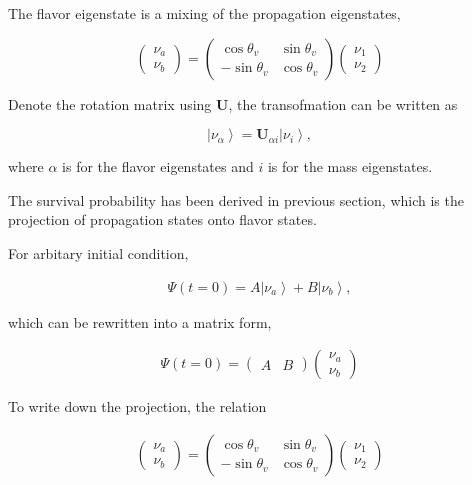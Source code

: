 \documentclass{tufte-handout}
\newcommand{\ket}[1]{\left| #1\right\rangle}
\begin{document}
The flavor eigenstate is a mixing of the propagation eigenstates,

\begin{equation}
\begin{pmatrix}
\nu_a \\ \nu_b \end{pmatrix} = 
\begin{pmatrix} \cos\theta_v & \sin\theta_v \\ -\sin\theta_v  & \cos\theta_v
\end{pmatrix} \begin{pmatrix}  \nu_1 \\ \nu_2
\end{pmatrix}
\end{equation}


Denote the rotation matrix using $\mathbf U$, the transofmation can be written as

\begin{equation}
\ket{\nu_{\alpha}} = \mathbf U_{\alpha i} \ket{\nu_i},
\end{equation}

where $\alpha$ is for the flavor eigenstates and $i$ is for the mass eigenstates.

The survival probability has been derived in previous section, which is the projection of propagation states onto flavor states.

For arbitary initial condition,

\begin{align}
    \Psi(t=0)= A \ket{\nu_a} + B \ket{\nu_b}, 
\end{align}

which can be rewritten into a matrix form,

\begin{align}
    \Psi(t=0) = \begin{pmatrix}
    A & B 
\end{pmatrix}\begin{pmatrix}
    \nu_a \\
    \nu_b 
\end{pmatrix}
\end{align}



To write down the projection, the relation

\begin{align}
    \begin{pmatrix}
        \nu_a \\
        \nu_b
    \end{pmatrix} = \begin{pmatrix}
        \cos\theta_v & \sin\theta_v \\ -\sin\theta_v  & \cos\theta_v
\end{pmatrix} \begin{pmatrix}  \nu_1 \\ \nu_2
\end{pmatrix}
\end{align}
\end{document}
